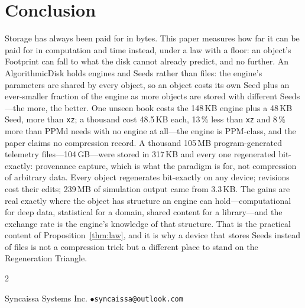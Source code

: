 \documentclass[11pt,a4paper]{article}
\theoremstyle{definition}
\theoremstyle{plain}
\theoremstyle{remark}
\newcommand{\adisk}{AlgorithmicDisk}
\begin{document}
\section{Conclusion}
Storage has always been paid for in bytes. This paper measures how far it can be paid for in
computation and time instead, under a law with a floor: an object's Footprint can fall to what
the disk cannot already predict, and no further. An \adisk{} holds engines and Seeds rather
than files: the engine's parameters are shared by every object, so an object costs its own
Seed plus an ever-smaller fraction of the engine as more objects are stored with different
Seeds---the more, the better. One unseen book costs the 148\,KB engine plus a 48\,KB Seed,
more than \texttt{xz}; a thousand cost 48.5\,KB each, 13\,\% less than \texttt{xz} and 8\,\% more
than PPMd needs with no engine at all---the engine is PPM-class, and the paper claims no
compression record. A thousand
105\,MB program-generated telemetry files---104\,GB---were stored in 317\,KB and every one
regenerated bit-exactly: provenance capture, which is what the paradigm is for, not compression
of arbitrary data. Every object regenerates bit-exactly on any device; revisions cost their edits;
239\,MB of simulation output came from 3.3\,KB. The gains are real exactly where the object has
structure an engine can hold---computational for deep data, statistical for a domain, shared
content for a library---and the exchange rate is the engine's knowledge of that structure. That is
the practical content of Proposition~\ref{thm:law}, and it is why a device that stores Seeds instead
of files is not a compression trick but a different place to stand on the Regeneration Triangle.

{\scriptsize\setlength{\bibsep}{0.4pt}\setlength{\columnsep}{12pt}
\begin{multicols}{2}\raggedright


\end{multicols}}

\vspace{6pt}
\begin{center}\small Syncaissa Systems Inc. \quad$\bullet$\quad \texttt{syncaissa@outlook.com}\end{center}
\end{document}
